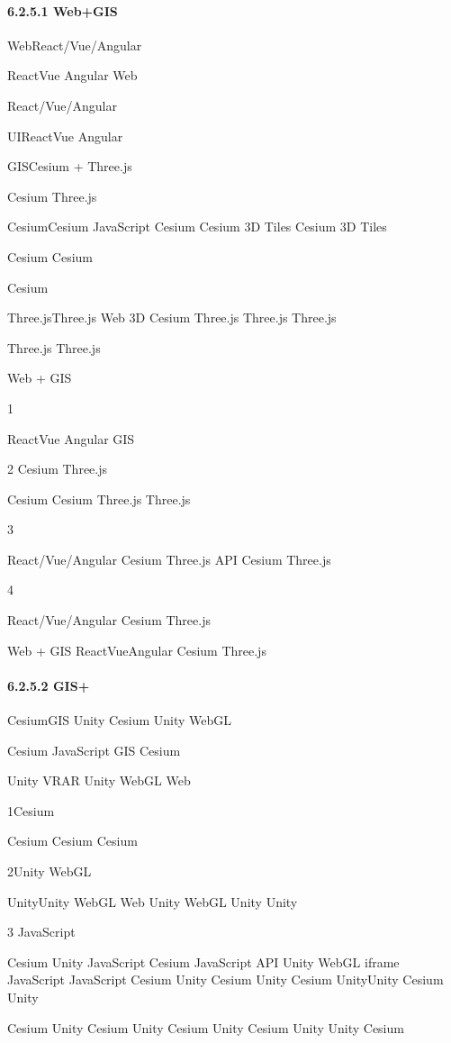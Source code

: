 \hypertarget{webgis}{%
\paragraph{6.2.5.1 Web+GIS}\label{webgis}}

WebReact/Vue/Angular

ReactVue Angular Web

React/Vue/Angular

UIReactVue Angular

GISCesium + Three.js

Cesium Three.js

CesiumCesium JavaScript Cesium Cesium 3D Tiles Cesium 3D Tiles

Cesium Cesium

Cesium

Three.jsThree.js Web 3D Cesium Three.js Three.js Three.js

Three.js Three.js

Web + GIS

1

ReactVue Angular GIS

2 Cesium Three.js

Cesium Cesium Three.js Three.js

3

React/Vue/Angular Cesium Three.js API Cesium Three.js

4

React/Vue/Angular Cesium Three.js

Web + GIS ReactVueAngular Cesium Three.js

\hypertarget{gis-2}{%
\paragraph{6.2.5.2 GIS+}\label{gis-2}}

CesiumGIS Unity Cesium Unity WebGL

Cesium JavaScript GIS Cesium

Unity VRAR Unity WebGL Web

1Cesium

Cesium Cesium Cesium

2Unity WebGL

UnityUnity WebGL Web Unity WebGL Unity Unity

3 JavaScript

Cesium Unity JavaScript Cesium JavaScript API Unity WebGL iframe
JavaScript JavaScript Cesium Unity Cesium Unity Cesium UnityUnity Cesium
Unity

Cesium Unity Cesium Unity Cesium Unity Cesium Unity Unity Cesium

